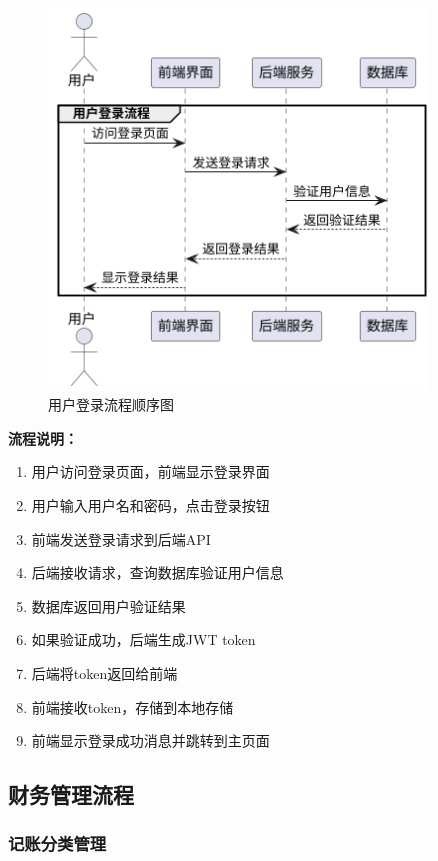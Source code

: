 \documentclass[a4paper]{article}
\begin{document}
\begin{figure}[H]
\centering
\includegraphics[width=0.9\textwidth]{img/sequence_diagram1.png}
\caption{用户登录流程顺序图}
\end{figure}

\textbf{流程说明：}

\begin{enumerate}
    \item 用户访问登录页面，前端显示登录界面
    \item 用户输入用户名和密码，点击登录按钮
    \item 前端发送登录请求到后端API
    \item 后端接收请求，查询数据库验证用户信息
    \item 数据库返回用户验证结果
    \item 如果验证成功，后端生成JWT token
    \item 后端将token返回给前端
    \item 前端接收token，存储到本地存储
    \item 前端显示登录成功消息并跳转到主页面
\end{enumerate}

\subsection{财务管理流程}

\subsubsection{记账分类管理}
\end{document}
